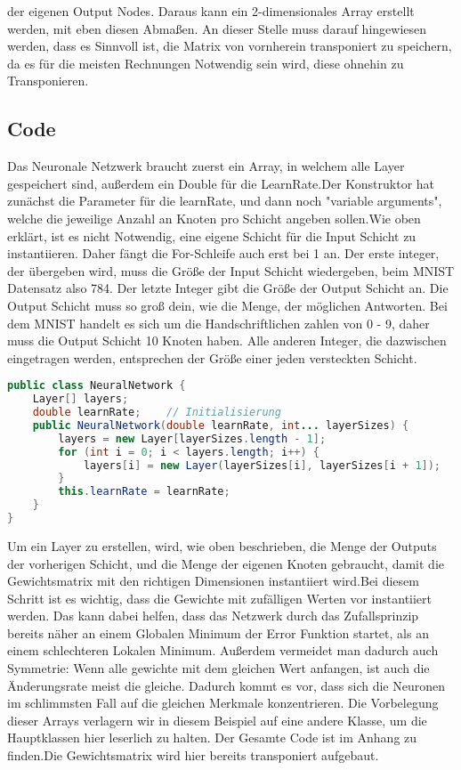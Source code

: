 \documentclass[12pt]{article}
\begin{document}
der eigenen Output Nodes. Daraus kann ein 2-dimensionales Array erstellt werden, mit eben diesen Abmaßen. An dieser Stelle muss darauf hingewiesen werden, dass es Sinnvoll ist, die Matrix von vornherein transponiert zu speichern, da es für die meisten Rechnungen Notwendig sein wird, diese ohnehin zu Transponieren.\subsection{ Code}Das Neuronale Netzwerk braucht zuerst ein Array, in welchem alle Layer gespeichert sind, außerdem ein Double für die LearnRate.Der Konstruktor hat zunächst die Parameter für die learnRate, und dann noch "variable arguments", welche die jeweilige Anzahl an Knoten pro Schicht angeben sollen.Wie oben erklärt, ist es nicht Notwendig, eine eigene Schicht für die Input Schicht zu instantiieren. Daher fängt die For-Schleife auch erst bei 1 an. Der erste integer, der übergeben wird, muss die Größe der Input Schicht wiedergeben, beim MNIST Datensatz also 784. Der letzte Integer gibt die Größe der Output Schicht an. Die Output Schicht muss so groß dein, wie die Menge, der möglichen Antworten. Bei dem MNIST handelt es sich um die Handschriftlichen zahlen von 0 - 9, daher muss die Output Schicht 10 Knoten haben. Alle anderen Integer, die dazwischen eingetragen werden, entsprechen der Größe einer jeden versteckten Schicht.\begin{lstlisting}[language=Java]
public class NeuralNetwork {
    Layer[] layers;
    double learnRate;    // Initialisierung
    public NeuralNetwork(double learnRate, int... layerSizes) {
        layers = new Layer[layerSizes.length - 1];
        for (int i = 0; i < layers.length; i++) {
            layers[i] = new Layer(layerSizes[i], layerSizes[i + 1]);
        }
        this.learnRate = learnRate;
    }
}
\end{lstlisting}Um ein Layer zu erstellen, wird, wie oben beschrieben, die Menge der Outputs der vorherigen Schicht, und die Menge der eigenen Knoten gebraucht, damit die Gewichtsmatrix mit den richtigen Dimensionen instantiiert wird.Bei diesem Schritt ist es wichtig, dass die Gewichte mit zufälligen Werten vor instantiiert werden. Das kann dabei helfen, dass das Netzwerk durch das Zufallsprinzip bereits näher an einem Globalen Minimum der Error Funktion startet, als an einem schlechteren Lokalen Minimum. Außerdem vermeidet man dadurch auch Symmetrie: Wenn alle gewichte mit dem gleichen Wert anfangen, ist auch die Änderungsrate meist die gleiche. Dadurch kommt es vor, dass sich die Neuronen im schlimmsten Fall auf die gleichen Merkmale konzentrieren. Die Vorbelegung dieser Arrays verlagern wir in diesem Beispiel auf eine andere Klasse, um die Hauptklassen hier leserlich zu halten. Der Gesamte Code ist im Anhang zu finden.Die Gewichtsmatrix wird hier bereits transponiert aufgebaut.\begin{lstlisting}[language=Java]

\end{lstlisting}
\end{document}
